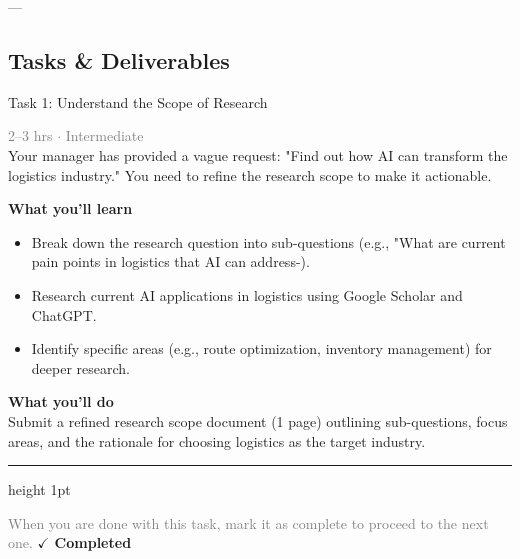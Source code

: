 \documentclass[10pt,a4paper]{article}
\begin{document}
---

\subsection*{Tasks \& Deliverables}

\begin{taskbox}{Task 1: Understand the Scope of Research}

    {\small \textcolor{gray}{2--3 hrs $\cdot$ Intermediate}}\\[12pt]

      
Your manager has provided a vague request: "Find out how AI can transform the logistics industry." You need to refine the research scope to make it actionable.  


\vspace{8pt}
{\large \textbf{\textcolor{brandLight}{What you'll learn}}}\\[4pt]  
\begin{itemize}
    \item Break down the research question into sub-questions (e.g., "What are current pain points in logistics that AI can address-).  
    \item Research current AI applications in logistics using Google Scholar and ChatGPT.  
    \item Identify specific areas (e.g., route optimization, inventory management) for deeper research.  
\end{itemize}

\vspace{8pt}
{\large \textbf{\textcolor{brandLight}{What you'll do}}}\\[4pt]  
Submit a refined research scope document (1 page) outlining sub-questions, focus areas, and the rationale for choosing logistics as the target industry.\par

    \vspace{16pt}

    \textcolor{cardBorder}{\hrule height 1pt}\vspace{8pt}

    \small \textcolor{gray}{When you are done with this task, mark it as complete to proceed to the next one.} \hfill \textbf{\textcolor{brandDark}{$\checkmark$ Completed}}

\end{taskbox}
\end{document}
